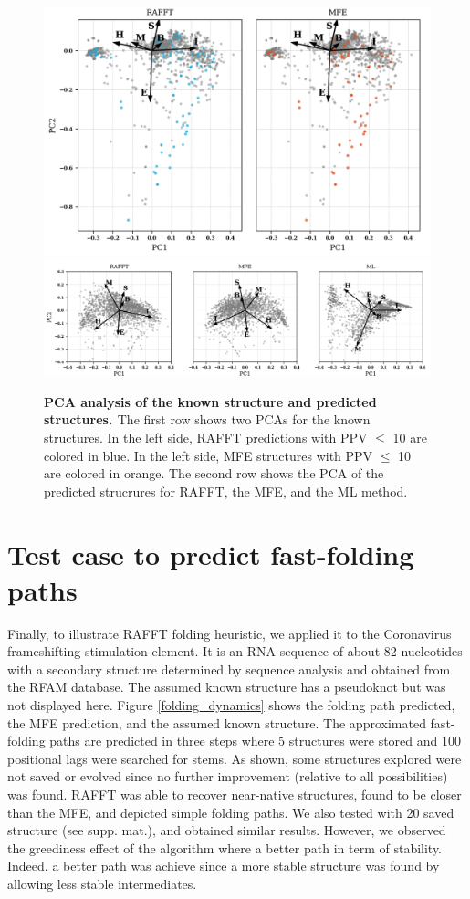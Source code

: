\documentclass[a4paper,12pt]{article}
\begin{document}
{{\begin{figure}[!ht]
  \centering
  \includegraphics[scale=0.6]{img/pca_known.png}\\
  \includegraphics[scale=0.7]{img/pca_predicted.png} 
  \caption{\textbf{PCA analysis of the known structure and predicted
      structures. \label{pca_struct}} The first row shows two PCAs for the known
    structures. In the left side, RAFFT predictions with PPV $\leq$ 10 are
    colored in blue. In the left side, MFE structures with PPV $\leq$ 10 are
    colored in orange. The second row shows the PCA of the predicted strucrures
    for RAFFT, the MFE, and the ML method.}
\end{figure}

\section*{Test case to predict fast-folding paths}
\label{sec:org305ed0a}
Finally, to illustrate RAFFT folding heuristic, we applied it to the Coronavirus
frameshifting stimulation element. It is an RNA sequence of about 82 nucleotides
with a secondary structure determined by sequence analysis and obtained from the
RFAM database. The assumed known structure has a pseudoknot but was not
displayed here. Figure \ref{folding_dynamics} shows the folding path predicted,
the MFE prediction, and the assumed known structure. The approximated
fast-folding paths are predicted in three steps where 5 structures were stored
and 100 positional lags were searched for stems. As shown, some structures
explored were not saved or evolved since no further improvement (relative to all
possibilities) was found. RAFFT was able to recover near-native structures,
found to be closer than the MFE, and depicted simple folding paths. We also
tested with 20 saved structure (see supp. mat.), and obtained similar results.
However, we observed the greediness effect of the algorithm where a better path
in term of stability. Indeed, a better path was achieve since a more stable
structure was found by allowing less stable intermediates.

}}
\end{document}
